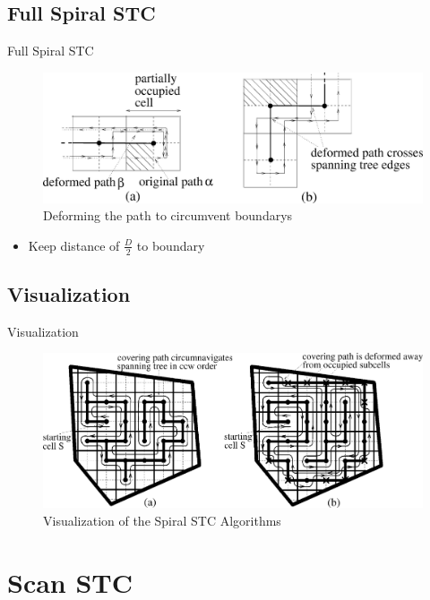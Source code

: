\documentclass{beamer}
\begin{document}
\subsection{Full Spiral STC}
\begin{frame}{Full Spiral STC}
    \begin{figure}
        \includegraphics[width=0.8\linewidth]{Images/inv_fig5.png}
        \caption{Deforming the path to circumvent boundarys}
    \end{figure}
    \begin{itemize}
        \item Keep distance of $\frac{D}{2}$ to boundary
    \end{itemize}
\end{frame}

\subsection{Visualization}
\begin{frame}{Visualization}
    \begin{figure}
        \includegraphics[width=\linewidth]{Images/inv_fig3.png}
        \caption{Visualization of the Spiral STC Algorithms}
    \end{figure}
\end{frame}

\section{Scan STC}
\end{document}
